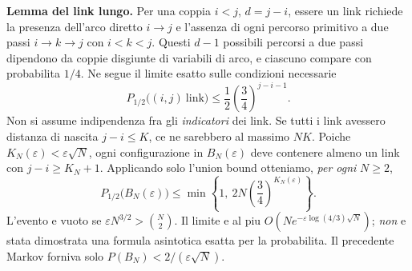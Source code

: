 \documentclass[11pt,a4paper]{article}
\begin{document}
\textbf{Lemma del link lungo.} Per una coppia $i<j$, $d=j-i$, essere un link richiede la presenza dell'arco diretto $i\to j$ e l'assenza di ogni percorso primitivo a due passi $i\to k\to j$ con $i<k<j$. Questi $d-1$ possibili percorsi a due passi dipendono da coppie disgiunte di variabili di arco, e ciascuno compare con probabilita $1/4$. Ne segue il limite esatto sulle condizioni necessarie
\begin{equation}
 \boxed{\ P_{1/2}\bigl((i,j)\ \mathrm{link}\bigr)
 \le\frac12\left(\frac34\right)^{j-i-1}.\ }\tag{RT.2}
\end{equation}
Non si assume indipendenza fra gli \emph{indicatori} dei link. Se tutti i link avessero distanza di nascita $j-i\le K$, ce ne sarebbero al massimo $NK$. Poiche $K_N(\varepsilon)<\varepsilon\sqrt N$, ogni configurazione in $B_N(\varepsilon)$ deve contenere almeno un link con $j-i\ge K_N+1$. Applicando solo l'union bound otteniamo, \emph{per ogni} $N\ge2$,
\begin{equation}
 \boxed{\ P_{1/2}\bigl(B_N(\varepsilon)\bigr)
 \le \min\left\{1,\ 2N\left(\frac34\right)^{K_N(\varepsilon)}\right\}.\ }\tag{RT.3}
\end{equation}
L'evento e vuoto se $\varepsilon N^{3/2}>\binom N2$. Il limite e al piu $O\!\left(N e^{-\varepsilon\log(4/3)\sqrt N}\right)$; \emph{non} e stata dimostrata una formula asintotica esatta per la probabilita. Il precedente Markov forniva solo $P(B_N)<2/(\varepsilon\sqrt N)$.

\clearpage
\end{document}
